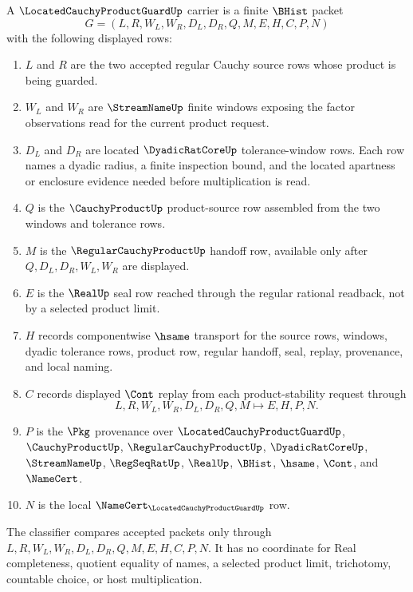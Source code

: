 \begin{definition}
\label{def:located-cauchy-product-guard-carrier}
A $\LocatedCauchyProductGuardUp$ carrier is a finite $\BHist$ packet
$$
G=(L,R,W_L,W_R,D_L,D_R,Q,M,E,H,C,P,N)
$$
with the following displayed rows:
\begin{enumerate}
\item $L$ and $R$ are the two accepted regular Cauchy source rows whose product is being guarded.
\item $W_L$ and $W_R$ are $\StreamNameUp$ finite windows exposing the factor observations read for the current product request.
\item $D_L$ and $D_R$ are located $\DyadicRatCoreUp$ tolerance-window rows. Each row names a dyadic radius, a finite inspection bound, and the located apartness or enclosure evidence needed before multiplication is read.
\item $Q$ is the $\CauchyProductUp$ product-source row assembled from the two windows and tolerance rows.
\item $M$ is the $\RegularCauchyProductUp$ handoff row, available only after $Q,D_L,D_R,W_L,W_R$ are displayed.
\item $E$ is the $\RealUp$ seal row reached through the regular rational readback, not by a selected product limit.
\item $H$ records componentwise $\hsame$ transport for the source rows, windows, dyadic tolerance rows, product row, regular handoff, seal, replay, provenance, and local naming.
\item $C$ records displayed $\Cont$ replay from each product-stability request through
$$
L,R,W_L,W_R,D_L,D_R,Q,M \longmapsto E,H,P,N .
$$
\item $P$ is the $\Pkg$ provenance over $\LocatedCauchyProductGuardUp$, $\CauchyProductUp$, $\RegularCauchyProductUp$, $\DyadicRatCoreUp$, $\StreamNameUp$, $\RegSeqRatUp$, $\RealUp$, $\BHist$, $\hsame$, $\Cont$, and $\NameCert$.
\item $N$ is the local $\NameCert_{\LocatedCauchyProductGuardUp}$ row.
\end{enumerate}
The classifier compares accepted packets only through $L,R,W_L,W_R,D_L,D_R,Q,M,E,H,C,P,N$. It has no coordinate for Real completeness, quotient equality of names, a selected product limit, trichotomy, countable choice, or host multiplication.
\end{definition}

